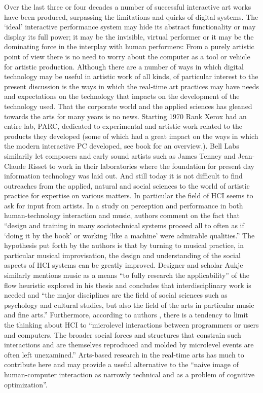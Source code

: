 Over the last three or four decades a number of successful interactive art works have been produced, surpassing the limitations and quirks of digital systems. The `ideal' interactive performance system may hide its abstract functionality or may display its full power; it may be the invisible, virtual performer or it may be the dominating force in the interplay with human performers: From a purely artistic point of view there is no need to worry about the computer as a tool or vehicle for artistic production. Although there are a number of ways in which digital technology may be useful in artistic work of all kinds, of particular interest to the present discussion is the ways in which the real-time art practices may have needs and expectations on the technology that impacts on the development of the technology used. That the corporate world and the applied sciences has gleaned towards the arts for many years is no news. Starting 1970 Rank Xerox had an entire lab, PARC, dedicated to experimental and artistic work related to the products they developed (some of which had a great impact on the ways in which the modern interactive PC developed, see \citeauthor{johnson97} book  for an overview.). Bell Labs similarily let composers and early sound artists such as James Tenney and Jean-Claude Risset to work in their laboratories where the foundation for present day information technology was laid out. And still today it is not difficult to find outreaches from the applied, natural and social sciences to the world of artistic practice for expertise on various matters. In particular the field of HCI seems to ask for input from artists. In a study on perception and performance in both human-technology interaction and music, authors \citeauthor{kirlik04} comment on the fact that ``design and training in many sociotechnical systems proceed all to often as if `doing it by the book' or working `like a machine' were admirable qualities.'' The hypothesis put forth by the authors is that by turning to musical practice, in particular musical improvisation, the design and understanding of the social aspects of HCI systems can be greatly improved. Designer and scholar Aukje \citeauthor{thomassen03} similarly mentions music as a means ``to fully research the applicability'' of the flow heuristic explored in his thesis and concludes that interdisciplinary work is needed and ``the major disciplines are the field of social sciences such as psychology and cultural studies, but also the field of the arts in particular music and fine arts.'' \parencite[239]{thomassen03} Furthermore, according to authors \citeauthor{engestrom96}, there is a tendency to limit the thinking about HCI to ``microlevel interactions between programmers or users and computers. The broader social forces and structures that constrain such interactions and are themselves reproduced and molded by microlevel events are often left unexamined.'' Arts-based research in the real-time arts has much to contribute here and may provide a useful alternative to the  ``naive image of human-computer interaction as narrowly technical and as a problem of cognitive optimization''. \parencite[325]{engestrom96} 

